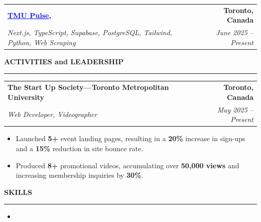 \documentclass[10pt]{article}
\newcommand{\resumesection}[1]{
  \vspace{2pt}
  {\textbf{#1}}\par
  \vspace{-6pt} %
  \rule{\textwidth}{0.5pt}\vspace{1pt}
}
\newcommand{\twoLineHeading}[4]{
  \begin{tabularx}{\textwidth}{X r}
    \textbf{#1} & \textbf{#2} \\
    \textit{#3} & \textit{#4} \\
  \end{tabularx}\vspace{-2pt}
}
\newcommand{\blueuline}[1]{\textcolor{blue}{\uline{#1}}}
\begin{document}
\vspace{1pt}

\twoLineHeading
{\href{https://tmupulse.ca}{\blueuline{TMU Pulse,}}}{Toronto, Canada}
{Next.js, TypeScript, Supabase, PostgreSQL, Tailwind, Python, Web Scraping}{June 2025 -- Present}

\begin{itemize}
\end{itemize}

\resumesection{ACTIVITIES and LEADERSHIP}
\twoLineHeading
{The Start Up Society---Toronto Metropolitan University}{Toronto, Canada}
{Web Developer, Videographer}{May 2025 -- Present}

\begin{itemize}
  \item Launched \textbf{5+} event landing pages, resulting in a \textbf{20\%} increase in sign-ups and a \textbf{15\%} reduction in site bounce rate.
  \item Produced \textbf{8+} promotional videos, accumulating over \textbf{50,000 views} and increasing membership inquiries by \textbf{30\%}.
\end{itemize}

\resumesection{SKILLS}
\begin{itemize}
  \item %
\end{itemize}
\end{document}
